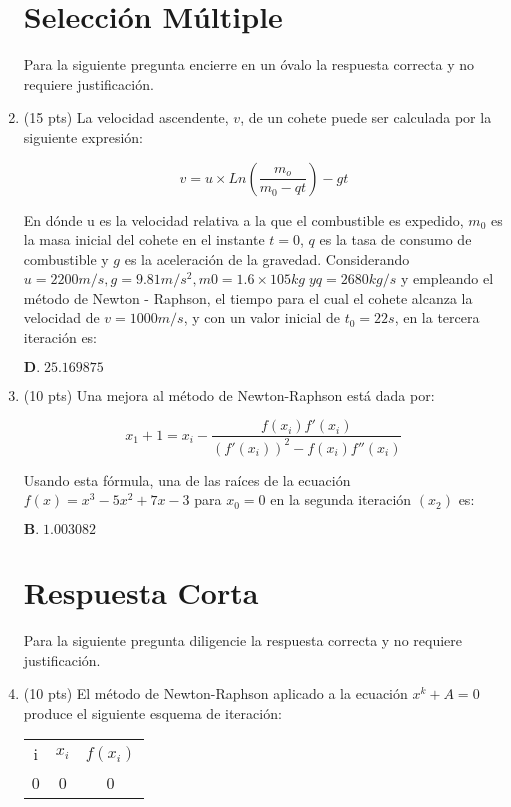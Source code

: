 \documentclass{exam}
\begin{document}
\begin{enumerate}
    \section*{Selección Múltiple}

    Para la siguiente pregunta encierre en un óvalo la respuesta correcta y no requiere justificación.

    \item (15 pts) La velocidad ascendente, $v$, de un cohete puede ser calculada por la siguiente expresión:
    
    \[ v = u \times Ln(\frac{m_o}{m_0-qt}) - gt \]

    En dónde u es la velocidad relativa a la que el combustible es expedido, $m_0$ es la masa inicial del cohete en el instante $t = 0$, $q$ 
    es la tasa de consumo de combustible y $g$ es la aceleración de la gravedad. Considerando $u = 2200m/s, g = 9.81m/s^2, m0 = 1.6 × 105kg \;y q = 2680kg/s $
    y empleando el método de Newton - Raphson, el tiempo para el cual el cohete alcanza la velocidad
    de $v = 1000m/s$, y con un valor inicial de $t_0 = 22s$, en la tercera iteración es:

    \( \textbf{D.}\;25.169875 \)

    \item (10 pts) Una mejora al método de Newton-Raphson está dada por:
    
    \[ x_1 + 1 = x_i - \frac{f(x_i) f'(x_i)}{(f'(x_i))^2 - f(x_i)f''(x_i) } \]
    
    Usando esta fórmula, una de las raíces de la ecuación $ f(x)=x^3-5x^2+7x-3 $ para $ x_0 = 0 $ en la segunda iteración $(x_2)$ es:

    \( \textbf{B.}\;1.003082 \)

    \section*{Respuesta Corta}

    Para la siguiente pregunta diligencie la respuesta correcta y no requiere justificación.

    \item (10 pts) El método de Newton-Raphson aplicado a la ecuación $x^k + A = 0$ produce el siguiente esquema de iteración:

    \begin{center}
        \begin{tabular}{ |c|c|c| } 
        \hline
        i & $x_i$ & $f(x_i)$ \\ 
        0 & 0 & 0 \\ 
        \hline
        \end{tabular}
    \end{center}

\end{enumerate}
\end{document}
